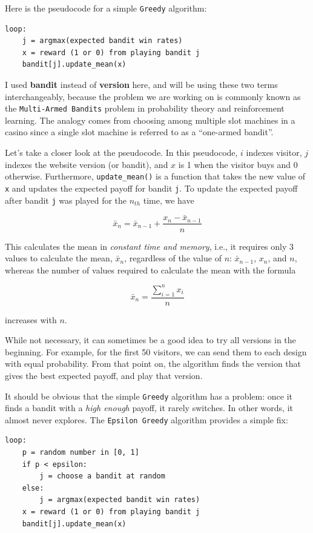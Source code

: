 \documentclass[
]{book}
\theoremstyle{definition}
\theoremstyle{definition}
\theoremstyle{definition}
\theoremstyle{definition}
\theoremstyle{remark}
\begin{document}
Here is the pseudocode for a simple \texttt{Greedy} algorithm:

\begin{verbatim}
loop:
    j = argmax(expected bandit win rates)
    x = reward (1 or 0) from playing bandit j
    bandit[j].update_mean(x)
\end{verbatim}

I used \textbf{bandit} instead of \textbf{version} here, and will be using these two terms interchangeably, because the problem we are working on is commonly known as the \texttt{Multi-Armed\ Bandits} problem in probability theory and reinforcement learning. The analogy comes from choosing among multiple slot machines in a casino since a single slot machine is referred to as a ``one-armed bandit''.

Let's take a closer look at the pseudocode. In this pseudocode, \(i\) indexes visitor, \(j\) indexes the website version (or bandit), and \(x\) is 1 when the visitor buys and 0 otherwise. Furthermore, \texttt{update\_mean()} is a function that takes the new value of \texttt{x} and updates the expected payoff for bandit \texttt{j}. To update the expected payoff after bandit \texttt{j} was played for the \(n_{th}\) time, we have

\[\bar{x}_n=\bar{x}_{n-1}+\frac{x_n-\bar{x}_{n-1}}{n}\]

This calculates the mean in \emph{constant time and memory}, i.e., it requires only 3 values to calculate the mean, \(\bar{x}_n\), regardless of the value of \(n\): \(\bar{x}_{n-1}\), \(x_n\), and \(n\), whereas the number of values required to calculate the mean with the formula

\[\bar{x}_n=\frac{\sum_{i=1}^n{x_i}}{n}\]

increases with \(n\).

While not necessary, it can sometimes be a good idea to try all versions in the beginning. For example, for the first 50 visitors, we can send them to each design with equal probability. From that point on, the algorithm finds the version that gives the best expected payoff, and play that version.

It should be obvious that the simple \texttt{Greedy} algorithm has a problem: once it finds a bandit with a \emph{high enough} payoff, it rarely switches. In other words, it almost never explores. The \texttt{Epsilon\ Greedy} algorithm provides a simple fix:

\begin{verbatim}
loop:
    p = random number in [0, 1]
    if p < epsilon:
        j = choose a bandit at random
    else:
        j = argmax(expected bandit win rates)
    x = reward (1 or 0) from playing bandit j
    bandit[j].update_mean(x)
\end{verbatim}
\end{document}
